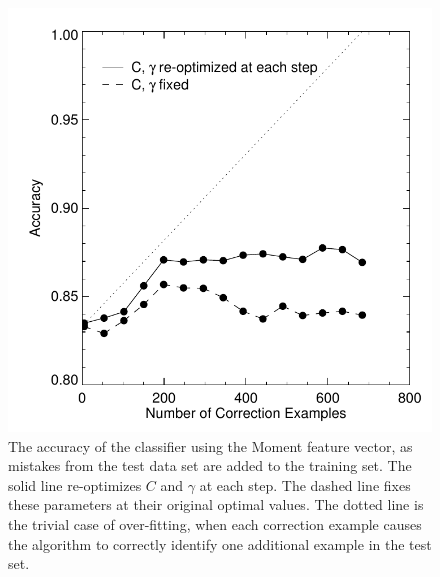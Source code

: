\begin{figure}
\includegraphics{correction_rate}
\caption{The accuracy of the classifier using the Moment feature vector, as mistakes from the test data set are added to the training set. The solid line re-optimizes $C$ and $\gamma$ at each step. The dashed line fixes these parameters at their original optimal values. The dotted line is the trivial case of over-fitting, when each correction example causes the algorithm to correctly identify one additional example in the test set.}
\label{fig:correction_rate}
\end{figure}

